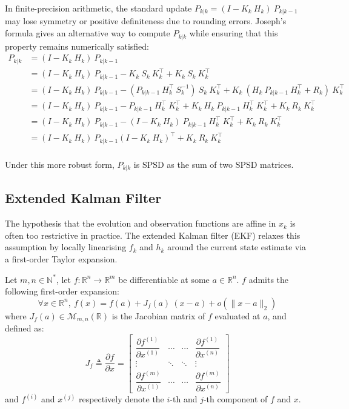 In finite-precision arithmetic, the standard update $P_{k|k}=(I-K_k\:H_k)\:P_{k|k-1}$ may lose symmetry or positive definiteness due to rounding errors. Joseph's formula gives an alternative way to compute $P_{k|k}$ while ensuring that this property remains numerically satisfied:
\begin{equation}
	\begin{aligned}
	P_{k|k}&=(I-K_k\:H_k)\:P_{k|k-1}\\
	&=(I-K_k\:H_k)\:P_{k|k-1}-K_k\:S_k\:K_k^\top+K_k\:S_k\:K_k^\top\\
	&=(I-K_k\:H_k)\:P_{k|k-1}-(P_{k|k-1}\:H_k^\top\:S_k^{-1})\:S_k\:K_k^\top+K_k\:(H_k\:P_{k|k-1}\:H_k^\top+R_k)\:K_k^\top\\
	&=(I-K_k\:H_k)\:P_{k|k-1}-P_{k|k-1}\:H_k^\top\:K_k^\top+K_k\:H_k\:P_{k|k-1}\:H_k^\top\:K_k^\top+K_k\:R_k\:K_k^\top\\
	&=(I-K_k\:H_k)\:P_{k|k-1}-(I-K_k\:H_k)\:P_{k|k-1}\:H_k^\top\:K_k^\top+K_k\:R_k\:K_k^\top\\
	&=(I-K_k\:H_k)\:P_{k|k-1}(I-K_k\:H_k)^\top+K_k\:R_k\:K_k^\top\\
	\end{aligned}
\end{equation}

Under this more robust form, $P_{k|k}$ is SPSD as the sum of two SPSD matrices.

\subsection{Extended Kalman Filter}

The hypothesis that the evolution and observation functions are affine in $x_k$ is often too restrictive in practice. The extended Kalman filter (EKF) relaxes this assumption by locally linearising $f_k$ and $h_k$ around the current state estimate via a first-order Taylor expansion.

Let $m,n\in\mathbb{N}^*$, let $f:\mathbb{R}^n\to\mathbb{R}^m$ be differentiable at some $a\in\mathbb{R}^n$. $f$ admits the following first-order expansion:
\begin{equation}
	\forall x\in\mathbb{R}^n,\:f(x)=f(a)+J_f(a)\:(x-a)+o(\|x-a\|_2)\label{eq:first_order_expansion}
\end{equation}
where $J_f(a)\in\mathcal{M}_{m,n}(\mathbb{R})$ is the Jacobian matrix of $f$ evaluated at $a$, and defined as:
\begin{equation}
	J_f\triangleq\frac{\partial f}{\partial x}=\begin{bmatrix}
	\dfrac{\partial f^{(1)}}{\partial x^{(1)}}&\cdots&\cdots&\dfrac{\partial f^{(1)}}{\partial x^{(n)}}\\
	\vdots&\ddots&\ddots&\vdots\\
	\dfrac{\partial f^{(m)}}{\partial x^{(1)}}&\cdots&\cdots&\dfrac{\partial f^{(m)}}{\partial x^{(n)}}
	\end{bmatrix}
\end{equation}
and $f^{(i)}$ and $x^{(j)}$ respectively denote the $i$-th and $j$-th component of $f$ and $x$.

